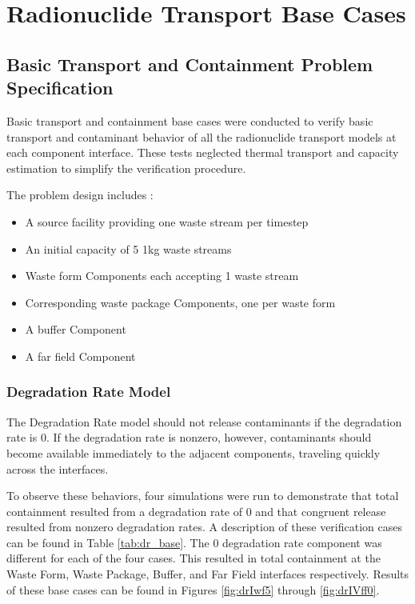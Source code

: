 \section{Radionuclide Transport Base Cases}\label{sec:nuclide_base_cases}
\subsection{Basic Transport and Containment Problem Specification}
Basic transport and containment base cases were conducted to verify basic 
transport and contaminant behavior of all the radionuclide transport models at 
each component interface. These tests neglected thermal transport and capacity 
estimation to simplify the verification procedure.  

The problem design includes : 
\begin{itemize}
\item{A source facility providing one waste stream per timestep}
\item{An initial capacity of 5 1kg waste streams}
\item{Waste form Components each accepting 1 waste stream} 
\item{Corresponding waste package Components, one per waste form}
\item{A buffer Component}
\item{A far field Component}
\end{itemize}

\subsubsection{Degradation Rate Model}
The Degradation Rate model should not release contaminants if the degradation 
rate is 0. If the degradation rate is nonzero, however, contaminants should 
become available immediately to the adjacent components, traveling quickly 
across the interfaces. 

To observe these behaviors, four simulations were run to demonstrate that total 
containment resulted from a degradation rate of 0 and that congruent release 
resulted from nonzero degradation rates. A description of these verification 
cases can be found in Table \ref{tab:dr_base}. The 0 degradation rate component was 
different for each of the four cases. This resulted in total containment at the 
Waste Form, Waste Package, Buffer, and Far Field interfaces respectively. 
Results of these base cases can be found in Figures 
\ref{fig:drIwf5} through \ref{fig:drIVff0}.
\FloatBarrier


\FloatBarrier

